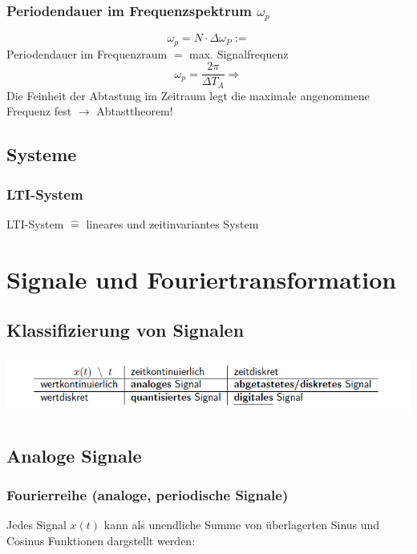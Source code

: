 \documentclass[12pt,a4paper]{scrartcl}
\begin{document}
\subsubsection{Periodendauer im Frequenzspektrum $\omega_p$}
\label{sec:sub:sub:omega-p}
$$\omega_p = N \cdot \Delta \omega_P :=$$ Periodendauer im Frequenzraum $=$ max. Signalfrequenz\\
$$\omega_p = \frac{2\pi}{\Delta T_A} \Rightarrow$$ Die Feinheit der Abtastung im Zeitraum legt die maximale angenommene Frequenz fest $\to$ Abtasttheorem!

\subsection{Systeme}
\label{sec:sub:systeme}

\subsubsection{LTI-System}
\label{sec:sub:lti-system}
LTI-System $\widehat{=}$ lineares und zeitinvariantes System


\newpage
\section{Signale und Fouriertransformation}
\label{sec:signale-und-fouriertransformation}


\subsection{Klassifizierung von Signalen}
\label{sec:sub:klassifizierung-von-signalen}
\includegraphics[height=2cm]{Pictures/Einheiten.png}


\subsection{Analoge Signale}
\label{sec:sub:analoge-signale}

\subsubsection{Fourierreihe (analoge, periodische Signale)}
\label{sec:sub:sub:fourier-reihe}

Jedes Signal $x(t)$ kann als unendliche Summe von überlagerten Sinus und Cosinus Funktionen dargstellt werden: \\
\end{document}
